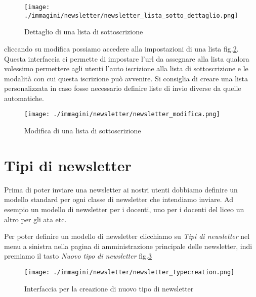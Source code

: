 \begin{figure}[H]
 \centering
 \texttt{[image: ./immagini/newsletter/newsletter\_lista\_sotto\_dettaglio.png]}
\caption{Dettaglio di una lista di sottoscrizione}
 \label{fig:newsletter_sott1}
\end{figure}

cliccando su modifica possiamo accedere alla impostazioni di una lista fig.\ref{fig:newsletter_modifica}. Questa interfaccia ci permette di impostare l'url da assegnare alla lista qualora volessimo permettere agli utenti l'auto iscrizione alla lista di sottoscrizione e le modalità con cui questa iscrizione può avvenire. Si consiglia di creare una lista personalizzata in caso fosse necessario definire liste di invio diverse da quelle automatiche. 

\begin{figure}[H]
 \centering
 \texttt{[image: ./immagini/newsletter/newsletter\_modifica.png]}
 \caption{Modifica di una lista di sottoscrizione}
 \label{fig:newsletter_modifica}
\end{figure}



\section{Tipi di newsletter}



Prima di poter inviare una newsletter ai nostri utenti dobbiamo definire un modello standard per ogni classe di newsletter che intendiamo inviare. Ad esempio un modello di newsletter per i docenti, uno per i docenti del liceo un altro per gli ata etc.

Per poter definire un modello di newsletter clicchiamo su \textsl{Tipi di newsletter} nel menu a sinistra nella pagina di amministrazione principale delle newsletter, indi premiamo il tasto \textsl{Nuovo tipo di newsletter} fig.\ref{fig:newsletter_type_crea}


\begin{figure}[H]
 \centering
 \texttt{[image: ./immagini/newsletter/newsletter\_typecreation.png]}
 \caption{Interfaccia per la creazione di nuovo tipo di newsletter}
 \label{fig:newsletter_type_crea}
\end{figure}

